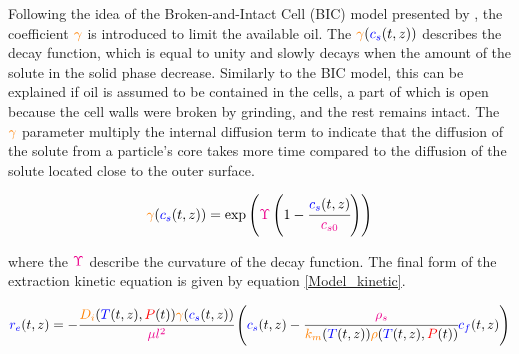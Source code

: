 \documentclass[../Article_Model_Parameters.tex]{subfiles}
\begin{document}
	Following the idea of the Broken-and-Intact Cell (BIC) model presented by \citet{Sovova2017}, the coefficient ${\color{orange} \gamma}$ is introduced to limit the available oil. The ${\color{orange} \gamma}({\color{blue} c_s} (t,z))$ describes the decay function, which is equal to unity and slowly decays when the amount of the solute in the solid phase decrease. Similarly to the BIC model, this can be explained if oil is assumed to be contained in the cells, a part of which is open because the cell walls were broken by grinding, and the rest remains intact. The ${\color{orange} \gamma}$ parameter multiply the internal diffusion term to indicate that the diffusion of the solute from a particle's core takes more time compared to the diffusion of the solute located close to the outer surface.
	
	{\footnotesize
		\begin{equation}
			{\color{orange} \gamma}({\color{blue} c_s} (t,z)) = \exp\left( {\color{magenta}\Upsilon} \left( 1-\cfrac{{\color{blue} c_s} (t,z) }{{\color{magenta}c_{s0}}} \right) \right) \label{EQ: C_sat_function}
		\end{equation} }
	
	where the ${\color{magenta}\Upsilon}$ describe the curvature of the decay function. The final form of the extraction kinetic equation is given by equation \ref{Model_kinetic}.
			
	{\scriptsize
		\begin{equation}
			\label{Model_kinetic}
				{\color{blue}r_e}(t,z) = -\cfrac{{\color{orange}D_i}({\color{blue}T}(t,z), {\color{red}P}(t)) {\color{orange} \gamma}({\color{blue} c_s} (t,z)) }{{\color{magenta} \mu l^2} } \left({\color{blue}{\color{blue} c_s} }(t,z)  - \cfrac{{\color{magenta}\rho_s}}{{\color{orange}k_m}({\color{blue}T}(t,z)){\color{orange}\rho}({\color{blue}T}(t,z),{\color{red}P}(t))}  {\color{blue}c_f}(t,z) \right)
		\end{equation} }
			
\end{document}
